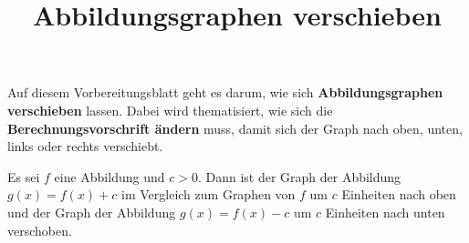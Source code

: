 \documentclass[]{uebungsblatt}
\title{Abbildungsgraphen verschieben}
\begin{document}
\maketitle
\begin{contents}
    Auf diesem Vorbereitungsblatt geht es darum, wie sich \textbf{Abbildungsgraphen verschieben} lassen. Dabei wird thematisiert, wie sich die \textbf{Berechnungsvorschrift ändern} muss, damit sich der Graph nach oben, unten, links oder rechts verschiebt.
\end{contents}
\begin{remark}
    Es sei $f$ eine Abbildung und $c>0$. Dann ist der Graph der Abbildung $g(x)=f(x)+c$ im Vergleich zum Graphen von $f$ um $c$ Einheiten nach oben und der Graph der Abbildung $g(x)=f(x)-c$ um $c$ Einheiten nach unten verschoben.
\end{remark}
\end{document}
